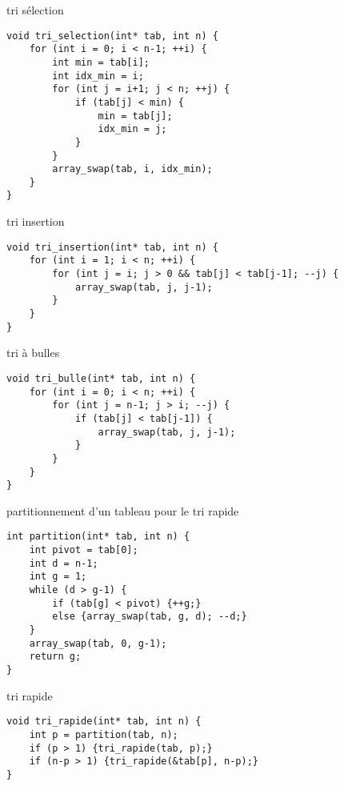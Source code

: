 \begin{fnc*}{tri sélection}
\begin{verbatim}
void tri_selection(int* tab, int n) {
    for (int i = 0; i < n-1; ++i) {
        int min = tab[i];
        int idx_min = i;
        for (int j = i+1; j < n; ++j) {
            if (tab[j] < min) {
                min = tab[j];
                idx_min = j;
            }
        }
        array_swap(tab, i, idx_min);
    }
}
\end{verbatim}
\end{fnc*}
\begin{fnc*}{tri insertion}
\begin{verbatim}
void tri_insertion(int* tab, int n) {
    for (int i = 1; i < n; ++i) {
        for (int j = i; j > 0 && tab[j] < tab[j-1]; --j) {
            array_swap(tab, j, j-1);
        }
    }
}
\end{verbatim}
\end{fnc*}
\begin{fnc*}{tri à bulles}
\begin{verbatim}
void tri_bulle(int* tab, int n) {
    for (int i = 0; i < n; ++i) {
        for (int j = n-1; j > i; --j) {
            if (tab[j] < tab[j-1]) {
                array_swap(tab, j, j-1);
            }
        }
    }
}
\end{verbatim}
\end{fnc*}
\begin{fnc*}{partitionnement d'un tableau pour le tri rapide}
\begin{verbatim}
int partition(int* tab, int n) {
    int pivot = tab[0];
    int d = n-1;
    int g = 1;
    while (d > g-1) {
        if (tab[g] < pivot) {++g;}
        else {array_swap(tab, g, d); --d;}
    }
    array_swap(tab, 0, g-1);
    return g;
}
\end{verbatim}
\end{fnc*}
\begin{fnc*}{tri rapide}
\begin{verbatim}
void tri_rapide(int* tab, int n) {
    int p = partition(tab, n);
    if (p > 1) {tri_rapide(tab, p);}
    if (n-p > 1) {tri_rapide(&tab[p], n-p);}
}
\end{verbatim}
\end{fnc*}

